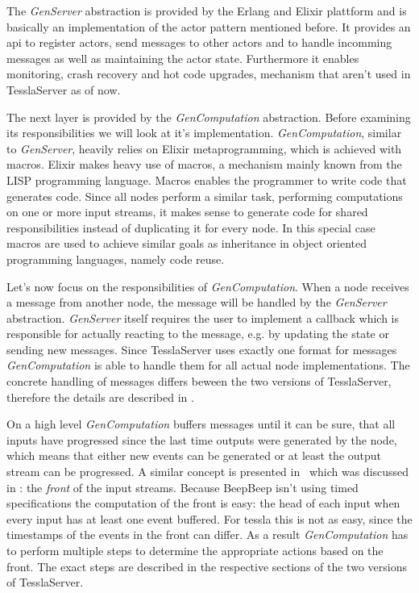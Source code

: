 The \emph{GenServer} abstraction is provided by the Erlang and Elixir plattform and is basically an implementation of the actor pattern mentioned before.
It provides an \gls{api} to register actors, send messages to other actors and to handle incomming messages as well as maintaining the actor state.
Furthermore it enables monitoring, crash recovery and hot code upgrades, mechanism that aren't used in TesslaServer as of now.

The next layer is provided by the \emph{GenComputation} abstraction.
Before examining its responsibilities we will look at it's implementation.
\emph{GenComputation}, similar to \emph{GenServer}, heavily relies on Elixir metaprogramming, which is achieved with macros.
Elixir makes heavy use of macros, a mechanism mainly known from the LISP programming language.
Macros enables the programmer to write code that generates code.
Since all nodes perform a similar task, performing computations on one or more input streams, it makes sense to generate code for shared responsibilities instead of duplicating it for every node.
In this special case macros are used to achieve similar goals as inheritance in object oriented programming languages, namely code reuse.

Let's now focus on the responsibilities of \emph{GenComputation}.
When a node receives a message from another node, the message will be handled by the \emph{GenServer} abstraction.
\emph{GenServer} itself requires the user to implement a callback which is responsible for actually reacting to the message, e.g. by updating the state or sending new messages.
Since TesslaServer uses exactly one format for messages \emph{GenComputation} is able to handle them for all actual node implementations.
The concrete handling of messages differs beween the two versions of TesslaServer, therefore the details are described in .

On a high level \emph{GenComputation} buffers messages until it can be sure, that all inputs have progressed since the last time outputs were generated by the node, which means that either new events can be generated or at least the output stream can be progressed.
A similar concept is presented in~\cite{TODOBEEPBEEP} which was discussed in : the \emph{front} of the input streams.
Because BeepBeep isn't using timed specifications the computation of the front is easy: the head of each input when every input has at least one event buffered.
For \gls{tessla} this is not as easy, since the timestamps of the events in the front can differ.
As a result \emph{GenComputation} has to perform multiple steps to determine the appropriate actions based on the front.
The exact steps are described in the respective sections of the two versions of TesslaServer.

